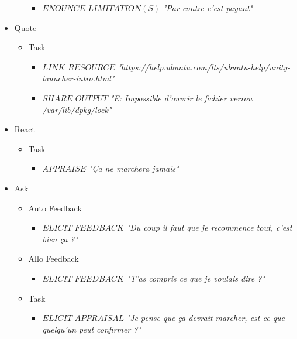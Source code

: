 \begin{itemize}
\begin{itemize}
\begin{itemize}
					\item $ENOUNCE$ $LIMITATION(S)$
						\newline \textit{"Par contre c'est payant"}
				\end{itemize}
		\end{itemize}
	\item Quote
		\begin{itemize}
			\item Task
				\begin{itemize}
					\item $LINK$ $RESOURCE$
						\newline \textit{"https://help.ubuntu.com/lts/ubuntu-help/unity-launcher-intro.html"}
					\item $SHARE$ $OUTPUT$
						\newline \textit{"E: Impossible d'ouvrir le fichier verrou /var/lib/dpkg/lock"}
				\end{itemize}
		\end{itemize}
	\item React
		\begin{itemize}
			\item Task
				\begin{itemize}
					\item $APPRAISE$
						\newline \textit{"Ça ne marchera jamais"}
				\end{itemize}
		\end{itemize}
	\item Ask
		\begin{itemize}
			\item Auto Feedback
				\begin{itemize}
					\item $ELICIT$ $FEEDBACK$
						\newline \textit{"Du coup il faut que je recommence tout, c'est bien ça ?"}
				\end{itemize}
			\item Allo Feedback
				\begin{itemize}
					\item $ELICIT$ $FEEDBACK$
						\newline \textit{"T'as compris ce que je voulais dire ?"}
				\end{itemize}
			\item Task
				\begin{itemize}
					\item $ELICIT$ $APPRAISAL$
						\newline \textit{"Je pense que ça devrait marcher, est ce que quelqu'un peut confirmer ?"}

\end{itemize}
\end{itemize}
\end{itemize}
